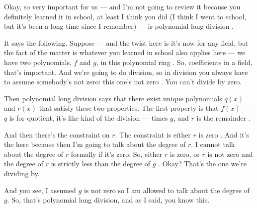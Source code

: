 \begin{speech}[00:26:17 - 00:28:16]
Okay, so very important for us --- and I'm not going to review it because you definitely learned it in school, at least I think you did (I think I went to school, but it's been a long time since I remember) --- is polynomial long division .

It says the following. Suppose --- and the twist here is it's now for any field, but the fact of the matter is whatever you learned in school also applies here --- we have two polynomials, $f$ and $g$, in this polynomial ring . So, coefficients in a field, that's important. And we're going to do division, so in division you always have to assume somebody's not zero: this one's not zero . You can't divide by zero.

Then polynomial long division says that there exist unique polynomials $q(x)$ and $r(x)$  that satisfy these two properties. The first property is that $f(x)$ --- $q$ is for quotient, it's like kind of the division --- times $g$, and $r$ is the remainder .

And then there's the constraint on $r$. The constraint is either $r$ is zero . And it's the  here because then I'm going to talk about the degree of $r$. I cannot talk about the degree of $r$ formally if it's zero. So, either $r$ is zero, or $r$ is not zero and the degree of $r$ is strictly less than the degree of $g$ . Okay? That's the one we're dividing by.

And you see, I assumed $g$ is not zero so I am allowed to talk about the degree of $g$. So, that's polynomial long division, and as I said, you know this.
\end{speech}

